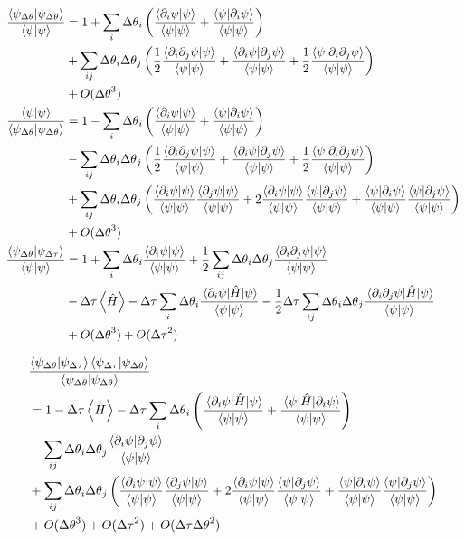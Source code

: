 \begin{align}
\fpsps{\ip{\psi_\dth}}
&= 1
+ \sum_i \dth_i \left( \fpsps{\ip{\pp_i \psi}{\psi}} + \fpsps{\ip{\psi}{\pp_i \psi}} \right) \nonumber \\
&+ \sum_{i j} \dth_i \dth_j \left( \frac{1}{2} \fpsps{\ip{\pp_i \pp_j \psi}{\psi}} + \fpsps{\ip{\pp_i \psi}{\pp_j \psi}} + \frac{1}{2} \fpsps{\ip{\psi}{\pp_i \pp_j \psi}} \right) \nonumber \\
&+ O(\dth^3) \\
%
\frac{\ip{\psi}}{\ip{\psi_\dth}}
&= 1
- \sum_i \dth_i \left( \fpsps{\ip{\pp_i \psi}{\psi}} + \fpsps{\ip{\psi}{\pp_i \psi}} \right) \nonumber \\
&- \sum_{i j} \dth_i \dth_j \left( \frac{1}{2} \fpsps{\ip{\pp_i \pp_j \psi}{\psi}} + \fpsps{\ip{\pp_i \psi}{\pp_j \psi}} + \frac{1}{2} \fpsps{\ip{\psi}{\pp_i \pp_j \psi}} \right) \nonumber \\
&+ \sum_{i j} \dth_i \dth_j \left( \fpsps{\ip{\pp_i \psi}{\psi}} \fpsps{\ip{\pp_j \psi}{\psi}} + 2 \fpsps{\ip{\pp_i \psi}{\psi}} \fpsps{\ip{\psi}{\pp_j \psi}} + \fpsps{\ip{\psi}{\pp_i \psi}} \fpsps{\ip{\psi}{\pp_j \psi}} \right) \nonumber \\
&+ O(\dth^3) \\
%
\fpsps{\ip{\psi_\dth}{\psi_\dta}}
&= 1
+ \sum_i \dth_i \fpsps{\ip{\pp_i \psi}{\psi}}
+ \frac{1}{2} \sum_{i j} \dth_i \dth_j \fpsps{\ip{\pp_i \pp_j \psi}{\psi}} \nonumber \\
&- \dta \ev{\hat{H}}
- \dta \sum_i \dth_i \fpsps{\mel{\pp_i \psi}{\hat{H}}{\psi}}
- \frac{1}{2} \dta \sum_{i j} \dth_i \dth_j \fpsps{\mel{\pp_i \pp_j \psi}{\hat{H}}{\psi}} \nonumber \\
&+ O(\dth^3) + O(\dta^2)
\end{align}

\begin{align}
&\frac{\ip{\psi_\dth}{\psi_\dta} \ip{\psi_\dta}{\psi_\dth}}{\ip{\psi_\dth}} \nonumber \\
&= 1 - \dta \ev{\hat{H}}
- \dta \sum_i \dth_i \left( \fpsps{\mel{\pp_i \psi}{\hat{H}}{\psi}} + \fpsps{\mel{\psi}{\hat{H}}{\pp_i \psi}} \right) \nonumber \\
&- \sum_{i j} \dth_i \dth_j \fpsps{\ip{\pp_i \psi}{\pp_j \psi}} \nonumber \\
&+ \sum_{i j} \dth_i \dth_j \left( \fpsps{\ip{\pp_i \psi}{\psi}} \fpsps{\ip{\pp_j \psi}{\psi}} + 2 \fpsps{\ip{\pp_i \psi}{\psi}} \fpsps{\ip{\psi}{\pp_j \psi}} + \fpsps{\ip{\psi}{\pp_i \psi}} \fpsps{\ip{\psi}{\pp_j \psi}} \right) \nonumber \\
&+ O(\dth^3) + O(\dta^2) + O(\dta \dth^2)
\end{align}
\fi

